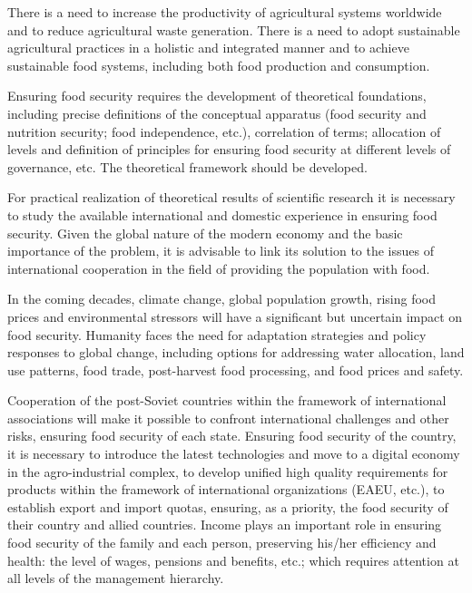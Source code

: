 \begin{multicols}{2}
There is a need to increase the productivity of agricultural systems
worldwide and to reduce agricultural waste generation. There is a need
to adopt sustainable agricultural practices in a holistic and integrated
manner and to achieve sustainable food systems, including both food
production and consumption.

Ensuring food security requires the development of theoretical
foundations, including precise definitions of the conceptual apparatus
(food security and nutrition security; food independence, etc.),
correlation of terms; allocation of levels and definition of principles
for ensuring food security at different levels of governance, etc. The
theoretical framework should be developed.

For practical realization of theoretical results of scientific research
it is necessary to study the available international and domestic
experience in ensuring food security. Given the global nature of the
modern economy and the basic importance of the problem, it is advisable
to link its solution to the issues of international cooperation in the
field of providing the population with food.

In the coming decades, climate change, global population growth, rising
food prices and environmental stressors will have a significant but
uncertain impact on food security. Humanity faces the need for
adaptation strategies and policy responses to global change, including
options for addressing water allocation, land use patterns, food trade,
post-harvest food processing, and food prices and safety.

Cooperation of the post-Soviet countries within the framework of
international associations will make it possible to confront
international challenges and other risks, ensuring food security of each
state. Ensuring food security of the country, it is necessary to
introduce the latest technologies and move to a digital economy in the
agro-industrial complex, to develop unified high quality requirements
for products within the framework of international organizations (EAEU,
etc.), to establish export and import quotas, ensuring, as a priority,
the food security of their country and allied countries. Income plays an
important role in ensuring food security of the family and each person,
preserving his/her efficiency and health: the level of wages, pensions
and benefits, etc.; which requires attention at all levels of the
management hierarchy.
\end{multicols}

